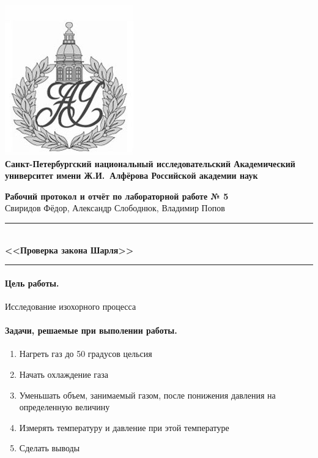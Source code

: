 \documentclass{article}
\begin{document}
\begin{center}
	\includegraphics[scale=0.25]{AU}\\
	{\Large\bfseries Санкт-Петербургский национальный исследовательский Академический университет имени Ж.И.~Алфёрова Российской академии наук}
\end{center}

\begin{center}
	{\large\textbf{Рабочий протокол и отчёт по лабораторной работе № 5}}\\
	Свиридов Фёдор, Александр Слободнюк, Владимир Попов
\end{center}

\begin{center}
	\rule{12cm}{0.4mm}\\
	\large\bfseries{<<Проверка закона Шарля>>}\\
	\rule{12cm}{0.4mm}
\end{center}
\paragraph{Цель работы.} Исследование изохорного процесса
\paragraph{Задачи, решаемые при выполении работы.}
\begin{enumerate}
	\item Нагреть газ до 50 градусов цельсия
	\item Начать охлаждение газа
	\item Уменьшать объем, занимаемый газом, после понижения давления на определенную величину
	\item Измерять температуру и давление при этой температуре
	\item Сделать выводы
\end{enumerate}
\end{document}
